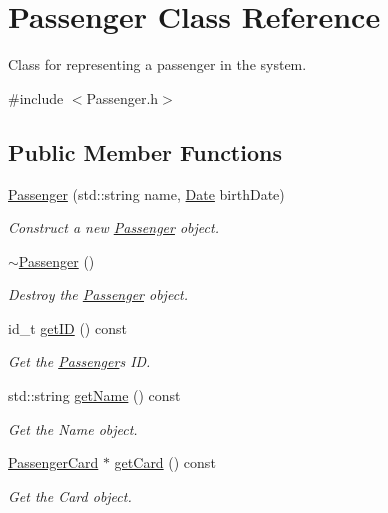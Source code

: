 \hypertarget{classPassenger}{}\section{Passenger Class Reference}
\label{classPassenger}


Class for representing a passenger in the system.  




{\ttfamily \#include $<$Passenger.\+h$>$}

\subsection*{Public Member Functions}
\begin{DoxyCompactItemize}
\item 
\mbox{\hyperlink{classPassenger_ac66212e8c1e35bb4423c6e1624ae31d9}{Passenger}} (std\+::string name, \mbox{\hyperlink{classDate}{Date}} birth\+Date)
\begin{DoxyCompactList}\small\item\em Construct a new \mbox{\hyperlink{classPassenger}{Passenger}} object. \end{DoxyCompactList}\item 
\mbox{\hyperlink{classPassenger_a6a6747cafd45d2c85db2ec4e873be3c7}{$\sim$\+Passenger}} ()
\begin{DoxyCompactList}\small\item\em Destroy the \mbox{\hyperlink{classPassenger}{Passenger}} object. \end{DoxyCompactList}\item 
id\+\_\+t \mbox{\hyperlink{classPassenger_ae6fcc19037be144f654c623c5b78ae24}{get\+ID}} () const
\begin{DoxyCompactList}\small\item\em Get the \mbox{\hyperlink{classPassenger}{Passenger}}\textquotesingle{}s ID. \end{DoxyCompactList}\item 
std\+::string \mbox{\hyperlink{classPassenger_a7c919f6947817ff1c6a4ee51923c116f}{get\+Name}} () const
\begin{DoxyCompactList}\small\item\em Get the Name object. \end{DoxyCompactList}\item 
\mbox{\hyperlink{classPassengerCard}{Passenger\+Card}} $\ast$ \mbox{\hyperlink{classPassenger_ae8d5310db80438702dec5f4d649289f1}{get\+Card}} () const
\begin{DoxyCompactList}\small\item\em Get the Card object. \end{DoxyCompactList}\item 

\end{DoxyCompactItemize}
